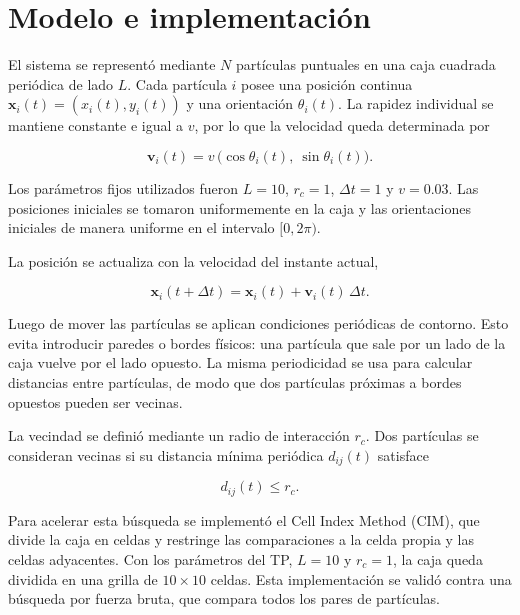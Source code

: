\documentclass[11pt,a4paper]{article}
\renewcommand{\vec}[1]{\mathbf{#1}}
\begin{document}
\section{Modelo e implementación}

El sistema se representó mediante $N$ partículas puntuales en una caja cuadrada periódica de lado $L$. Cada partícula $i$ posee una posición continua $\vec{x}_i(t) = (x_i(t), y_i(t))$ y una orientación $\theta_i(t)$. La rapidez individual se mantiene constante e igual a $v$, por lo que la velocidad queda determinada por

\begin{equation}
\vec{v}_i(t) = v\,\big(\cos\theta_i(t),\ \sin\theta_i(t)\big).
\label{eq:velocidad}
\end{equation}

Los parámetros fijos utilizados fueron $L=10$, $r_c=1$, $\Delta t=1$ y $v=0.03$. Las posiciones iniciales se tomaron uniformemente en la caja y las orientaciones iniciales de manera uniforme en el intervalo $[0,2\pi)$.

La posición se actualiza con la velocidad del instante actual,

\begin{equation}
\vec{x}_i(t+\Delta t) = \vec{x}_i(t) + \vec{v}_i(t)\,\Delta t.
\label{eq:posicion}
\end{equation}

Luego de mover las partículas se aplican condiciones periódicas de contorno. Esto evita introducir paredes o bordes físicos: una partícula que sale por un lado de la caja vuelve por el lado opuesto. La misma periodicidad se usa para calcular distancias entre partículas, de modo que dos partículas próximas a bordes opuestos pueden ser vecinas.

La vecindad se definió mediante un radio de interacción $r_c$. Dos partículas se consideran vecinas si su distancia mínima periódica $d_{ij}(t)$ satisface

\begin{equation}
d_{ij}(t) \le r_c.
\label{eq:vecindad}
\end{equation}

Para acelerar esta búsqueda se implementó el Cell Index Method (CIM), que divide la caja en celdas y restringe las comparaciones a la celda propia y las celdas adyacentes. Con los parámetros del TP, $L=10$ y $r_c=1$, la caja queda dividida en una grilla de $10\times10$ celdas. Esta implementación se validó contra una búsqueda por fuerza bruta, que compara todos los pares de partículas.
\end{document}
